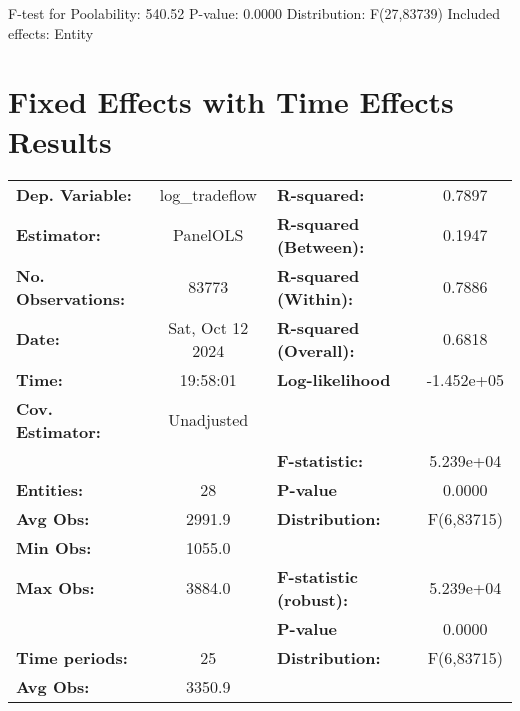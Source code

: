 \documentclass{article}
\begin{document}
F-test for Poolability: 540.52 \newline
 P-value: 0.0000 \newline
 Distribution: F(27,83739) \newline
  \newline
 Included effects: Entity\section*{Fixed Effects with Time Effects Results}
\begin{center}
\begin{tabular}{lclc}
\toprule
\textbf{Dep. Variable:}    &   log\_tradeflow   & \textbf{  R-squared:         }   &      0.7897      \\
\textbf{Estimator:}        &      PanelOLS      & \textbf{  R-squared (Between):}  &      0.1947      \\
\textbf{No. Observations:} &       83773        & \textbf{  R-squared (Within):}   &      0.7886      \\
\textbf{Date:}             &  Sat, Oct 12 2024  & \textbf{  R-squared (Overall):}  &      0.6818      \\
\textbf{Time:}             &      19:58:01      & \textbf{  Log-likelihood     }   &    -1.452e+05    \\
\textbf{Cov. Estimator:}   &     Unadjusted     & \textbf{                     }   &                  \\
\textbf{}                  &                    & \textbf{  F-statistic:       }   &    5.239e+04     \\
\textbf{Entities:}         &         28         & \textbf{  P-value            }   &      0.0000      \\
\textbf{Avg Obs:}          &       2991.9       & \textbf{  Distribution:      }   &    F(6,83715)    \\
\textbf{Min Obs:}          &       1055.0       & \textbf{                     }   &                  \\
\textbf{Max Obs:}          &       3884.0       & \textbf{  F-statistic (robust):} &    5.239e+04     \\
\textbf{}                  &                    & \textbf{  P-value            }   &      0.0000      \\
\textbf{Time periods:}     &         25         & \textbf{  Distribution:      }   &    F(6,83715)    \\
\textbf{Avg Obs:}          &       3350.9       & \textbf{                     }   &                  \\

\end{tabular}
\end{center}
\end{document}

